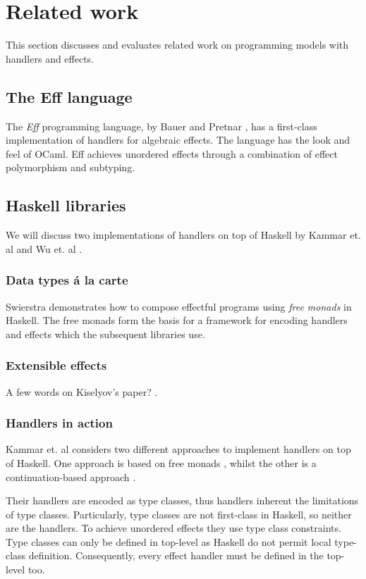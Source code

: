 \section{Related work}\label{sec:relatedwork}
This section discusses and evaluates related work on programming models with handlers and effects.

\subsection{The Eff language}
The \emph{Eff} programming language, by Bauer and Pretnar \cite{Bauer2015}, has a first-class implementation of handlers for algebraic effects. The language has the look and feel of OCaml.
Eff achieves unordered effects through a combination of effect polymorphism and subtyping. 

\subsection{Haskell libraries}
We will discuss two implementations of handlers on top of Haskell by Kammar et. al \cite{Kammar2013} and Wu et. al \cite{Wu2014}.

\subsubsection{Data types á la carte}
Swierstra \cite{Swierstra2008} demonstrates how to compose effectful programs using \emph{free monads} in Haskell.
The free monads form the basis for a framework for encoding handlers and effects which the subsequent libraries use.

\subsubsection{Extensible effects}
A few words on Kiselyov's paper? \cite{Kiselyov2013}.

\subsubsection{Handlers in action}
Kammar et. al considers two different approaches to implement handlers on top of Haskell. One approach is based on free monads \cite{Swierstra2008}, whilst the other is a continuation-based approach \cite{Kammar2013}.

Their handlers are encoded as type classes, thus handlers inherent the limitations of type classes. Particularly, type classes are not first-class in Haskell, so neither are the handlers.
To achieve unordered effects they use type class constraints. Type classes can only be defined in top-level as Haskell do not permit local type-class definition. Consequently, every effect handler must be defined in the top-level too.

